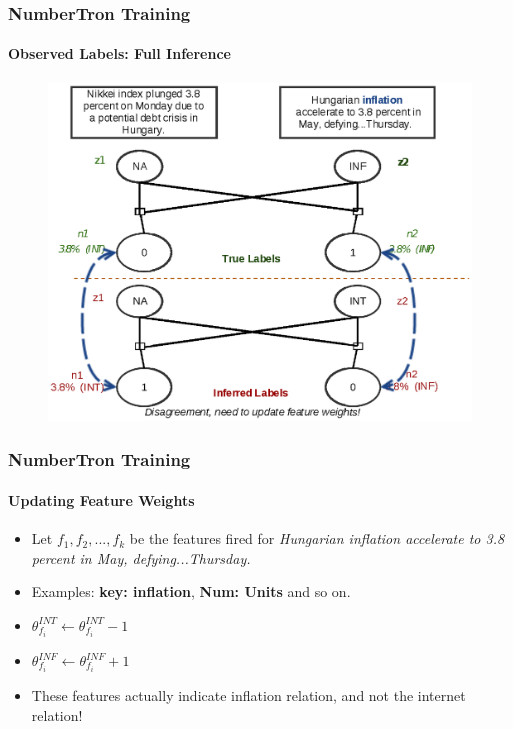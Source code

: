 \documentclass{beamer}
\begin{document}
\begin{frame}
\frametitle{NumberTron Training}
\framesubtitle{Observed Labels: Full Inference}
\begin{figure}
\includegraphics[width=\textwidth, height=0.85\textheight]{images/fullinf_4.eps}
\end{figure}
\end{frame}


\begin{frame}
\frametitle{NumberTron Training}
\framesubtitle{Updating Feature Weights}
\begin{itemize}
\setlength{\itemsep}{1em}
\item Let $f_1, f_2, ..., f_k$ be the features fired for \textit{Hungarian inflation  accelerate to 3.8 percent in May, defying...Thursday.}
\item Examples: \textbf{key: inflation}, \textbf{Num: Units} and so on.
\item $\theta_{f_i}^{INT} \gets \theta_{f_i}^{INT} - 1$
\item $\theta_{f_i}^{INF} \gets \theta_{f_i}^{INF} + 1$
\item These features actually indicate inflation relation, and not the internet relation!
\end{itemize}
\end{frame}
\end{document}
